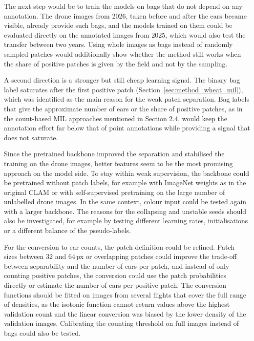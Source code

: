\documentclass[12pt,parskip = half, DIV=classic,listof=totoc]{scrartcl}
\begin{document}
			The next step would be to train the models on bags that do not depend on any annotation. The drone images 
			from 2026, taken before and after the ears became visible, already provide such bags, and the models trained 
			on them could be evaluated directly on the annotated images from 2025, which would also test the transfer 
			between two years. Using whole images as bags instead of randomly sampled patches would additionally show 
			whether the method still works when the share of positive patches is given by the field and not by the 
			sampling.

			A second direction is a stronger but still cheap learning signal. The binary bag label saturates after 
			the first positive patch (Section~\ref{sec:method_wheat_mil}), which was identified as the main reason for the weak patch separation. 
			Bag labels that give the approximate number of ears or the share of positive patches, as in the count-based 
			MIL approaches mentioned in Section 2.4, would keep the annotation effort far below that of point annotations 
			while providing a signal that does not saturate.

			Since the pretrained backbone improved the separation and stabilised the training on the drone images, better 
			features seem to be the most promising approach on the model side. To stay within weak supervision, the 
			backbone could be pretrained without patch labels, for example with ImageNet weights as in the original CLAM 
			or with self-supervised pretraining on the large number of unlabelled drone images. In the same context, 
			colour input could be tested again with a larger backbone. The reasons for the collapsing and unstable seeds should also be 
			investigated, for example by testing different learning rates, initialisations or a different balance of the 
			pseudo-labels.

			For the conversion to ear counts, the patch definition could be refined. Patch sizes between 32 and 64\,px or 
			overlapping patches could improve the trade-off between separability and the number of ears per patch, and 
			instead of only counting positive patches, the conversion could use the patch probabilities directly or 
			estimate the number of ears per positive patch. The conversion functions should be fitted on images from 
			several flights that cover the full range of densities, as the isotonic function cannot return values above 
			the highest validation count and the linear conversion was biased by the lower density of the validation 
			images. Calibrating the counting threshold on full images instead of bags could also be tested.
\end{document}
